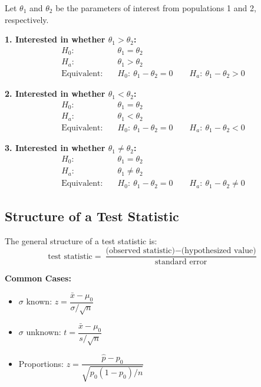 Let $\theta_1$ and $\theta_2$ be the parameters of interest from populations 1 and 2, respectively.

\vspace{0.8em}
\noindent\textbf{1. Interested in whether $\theta_1 > \theta_2$:}
\begin{align*}
H_0\!:~ & \theta_1 = \theta_2 \\
H_a\!:~ & \theta_1 > \theta_2 \\
\text{Equivalent:} \quad & H_0\!:~ \theta_1 - \theta_2 = 0 \qquad H_a\!:~ \theta_1 - \theta_2 > 0
\end{align*}

\vspace{0.8em}
\noindent\textbf{2. Interested in whether $\theta_1 < \theta_2$:}
\begin{align*}
H_0\!:~ & \theta_1 = \theta_2 \\
H_a\!:~ & \theta_1 < \theta_2 \\
\text{Equivalent:} \quad & H_0\!:~ \theta_1 - \theta_2 = 0 \qquad H_a\!:~ \theta_1 - \theta_2 < 0
\end{align*}

\vspace{0.8em}
\noindent\textbf{3. Interested in whether $\theta_1 \ne \theta_2$:}
\begin{align*}
H_0\!:~ & \theta_1 = \theta_2 \\
H_a\!:~ & \theta_1 \ne \theta_2 \\
\text{Equivalent:} \quad & H_0\!:~ \theta_1 - \theta_2 = 0 \qquad H_a\!:~ \theta_1 - \theta_2 \ne 0
\end{align*}
\subsection*{Structure of a Test Statistic}

\noindent
The general structure of a test statistic is:
\[
\text{test statistic} = \frac{\text{(observed statistic)} - \text{(hypothesized value)}}{\text{standard error}}
\]

\bigskip
\noindent\textbf{Common Cases:}
\begin{itemize}
  \item $\sigma$ known: \quad $z = \dfrac{\bar{x} - \mu_0}{\sigma / \sqrt{n}}$
  \item $\sigma$ unknown: \quad $t = \dfrac{\bar{x} - \mu_0}{s / \sqrt{n}}$
  \item Proportions: \quad $z = \dfrac{\hat{p} - p_0}{\sqrt{p_0(1 - p_0)/n}}$
\end{itemize}
